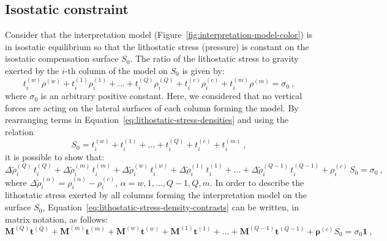 \documentclass[manuscript]{geophysics}
\begin{document}
\subsection{Isostatic constraint}

Consider that the interpretation model (Figure~\ref{fig:interpretation-model-color})
is in isostatic equilibrium \citep{turcotte-schubert2002, hofmann-wellenhof-moritz2005,
lowrie2007} so that the lithostatic stress (pressure) is constant on the
isostatic compensation surface $S_{0}$.
The ratio of the lithostatic stress to gravity exerted by the $i$-th 
column of the model on $S_{0}$ is given by:
\begin{equation}
t^{(w)}_{i} \rho^{(w)} + t^{(1)}_{i} \rho^{(1)}_{i} + \dots + 
t^{(Q)}_{i} \rho^{(Q)}_{i} + t^{(c)}_{i} \rho^{(c)}_{i} + t^{(m)}_{i} \rho^{(m)} 
= \sigma_{0} \: ,
\label{eq:lithostatic-stress-densities}
\end{equation}
where $\sigma_{0}$ is an arbitrary positive constant. 
Here, we considered that no vertical forces are acting on the lateral surfaces of 
each column forming the model.
By rearranging terms in Equation~\ref{eq:lithostatic-stress-densities} 
and using the relation
\begin{equation}
S_{0} = t^{(w)}_{i} + t^{(1)}_{i} + \dots + t^{(Q)}_{i} + t^{(c)}_{i} + t^{(m)}_{i} \: ,
\label{eq:S0}
\end{equation}
it is possible to show that:
\begin{equation}
\Delta \tilde{\rho}^{(Q)}_{i} \, t^{(Q)}_{i} + 
\Delta \tilde{\rho}^{(m)}_{i} \, t^{(m)}_{i} + 
\Delta \tilde{\rho}^{(w)}_{i} \, t^{(w)}_{i} + 
\Delta \tilde{\rho}^{(1)}_{i} \, t^{(1)}_{i} +
\dots + 
\Delta \tilde{\rho}^{(Q-1)}_{i} \, t^{(Q-1)}_{i} +
\rho^{(c)}_{i} \, S_{0} = \sigma_{0} \: ,
\label{eq:lithostatic-stress-density-contrasts}
\end{equation}
where $\Delta \tilde{\rho}^{(\alpha)}_{i} = \rho^{(\alpha)}_{i} - \rho^{(c)}_{i}$, 
$\alpha = w, 1, \dots, Q-1, Q, m$.
In order to describe the lithostatic stress exerted by all columns forming the
interpretation model on the surface $S_{0}$, 
Equation~\ref{eq:lithostatic-stress-density-contrasts} 
can be written, in matrix notation, as follows:
\begin{equation}
\mathbf{M}^{(Q)} \mathbf{t}^{(Q)} + \mathbf{M}^{(m)} \mathbf{t}^{(m)} + \mathbf{M}^{(w)}
\mathbf{t}^{(w)} + \mathbf{M}^{(1)} \mathbf{t}^{(1)} + \dots + \mathbf{M}^{(Q-1)}
\mathbf{t}^{(Q-1)} + \boldsymbol{\rho}^{(c)} S_{0} = \sigma_{0} \mathbf{1} \: ,
\label{eq:lithostatic-stress-matrix}
\end{equation}
\end{document}
